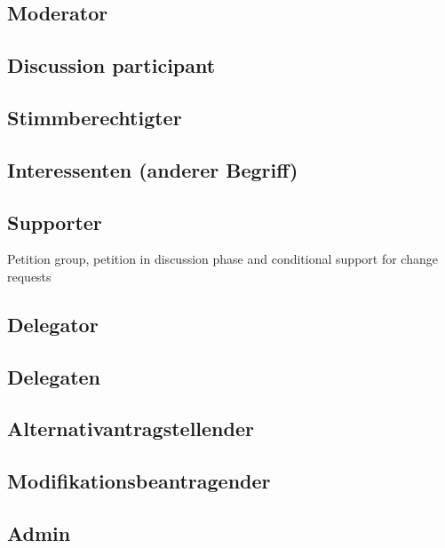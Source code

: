 \subsection{Moderator}
\label{ssec:Roles_Moderator}

\subsection{Discussion participant}
\label{ssec:Roles_DiscussionParticipant}

\subsection{Stimmberechtigter}
\label{ssec:Roles_Stimmberechtigter}

\subsection{Interessenten (anderer Begriff)}
\label{ssec:Roles_Interessenten}

\subsection{Supporter}
\label{ssec:Roles_Supporter}
Petition group, petition in discussion phase and conditional support for change requests

\subsection{Delegator}
\label{ssec:Roles_Delegator}

\subsection{Delegaten}
\label{ssec:Roles_Delegaten}

\subsection{Alternativantragstellender}
\label{ssec:Roles_Alternativantragstellender}

\subsection{Modifikationsbeantragender}
\label{ssec:Roles_Modifikationsbeantragender}

\subsection{Admin}
\label{ssec:Roles_Admin}


